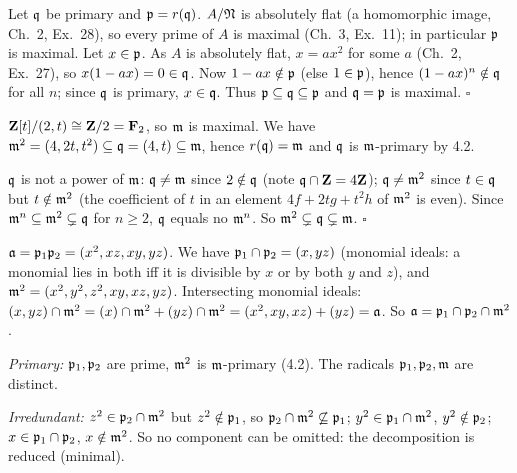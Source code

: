 \documentclass[11pt]{article}
\begin{document}
\pf
Let $\mathfrak q$ be primary and $\mathfrak p=r(\mathfrak q)$. $A/\mathfrak N$ is absolutely flat (a homomorphic image, Ch.~2, Ex.~28), so every prime of $A$ is maximal (Ch.~3, Ex.~11); in particular $\mathfrak p$ is maximal. Let $x\in\mathfrak p$. As $A$ is absolutely flat, $x=ax^2$ for some $a$ (Ch.~2, Ex.~27), so $x(1-ax)=0\in\mathfrak q$. Now $1-ax\notin\mathfrak p$ (else $1\in\mathfrak p$), hence $(1-ax)^n\notin\mathfrak q$ for all $n$; since $\mathfrak q$ is primary, $x\in\mathfrak q$. Thus $\mathfrak p\subseteq\mathfrak q\subseteq\mathfrak p$ and $\mathfrak q=\mathfrak p$ is maximal. \hfill$\square$

\pf
$\mathbf Z[t]/(2,t)\cong\mathbf Z/2=\mathbf F_2$, so $\mathfrak m$ is maximal. We have $\mathfrak m^2=(4,2t,t^2)\subseteq\mathfrak q=(4,t)\subseteq\mathfrak m$, hence $r(\mathfrak q)=\mathfrak m$ and $\mathfrak q$ is $\mathfrak m$-primary by 4.2.

$\mathfrak q$ is not a power of $\mathfrak m$: $\mathfrak q\ne\mathfrak m$ since $2\notin\mathfrak q$ (note $\mathfrak q\cap\mathbf Z=4\mathbf Z$); $\mathfrak q\ne\mathfrak m^2$ since $t\in\mathfrak q$ but $t\notin\mathfrak m^2$ (the coefficient of $t$ in an element $4f+2tg+t^2h$ of $\mathfrak m^2$ is even). Since $\mathfrak m^n\subseteq\mathfrak m^2\subsetneq\mathfrak q$ for $n\ge2$, $\mathfrak q$ equals no $\mathfrak m^n$. So $\mathfrak m^2\subsetneq\mathfrak q\subsetneq\mathfrak m$. \hfill$\square$

\pf
$\mathfrak a=\mathfrak p_1\mathfrak p_2=(x^2,xz,xy,yz)$. We have $\mathfrak p_1\cap\mathfrak p_2=(x,yz)$ (monomial ideals: a monomial lies in both iff it is divisible by $x$ or by both $y$ and $z$), and $\mathfrak m^2=(x^2,y^2,z^2,xy,xz,yz)$. Intersecting monomial ideals: $(x,yz)\cap\mathfrak m^2=(x)\cap\mathfrak m^2+(yz)\cap\mathfrak m^2=(x^2,xy,xz)+(yz)=\mathfrak a$. So $\mathfrak a=\mathfrak p_1\cap\mathfrak p_2\cap\mathfrak m^2$.

\emph{Primary:} $\mathfrak p_1,\mathfrak p_2$ are prime, $\mathfrak m^2$ is $\mathfrak m$-primary (4.2). The radicals $\mathfrak p_1,\mathfrak p_2,\mathfrak m$ are distinct.

\emph{Irredundant:} $z^2\in\mathfrak p_2\cap\mathfrak m^2$ but $z^2\notin\mathfrak p_1$, so $\mathfrak p_2\cap\mathfrak m^2\not\subseteq\mathfrak p_1$; $y^2\in\mathfrak p_1\cap\mathfrak m^2$, $y^2\notin\mathfrak p_2$; $x\in\mathfrak p_1\cap\mathfrak p_2$, $x\notin\mathfrak m^2$. So no component can be omitted: the decomposition is reduced (minimal).
\end{document}
